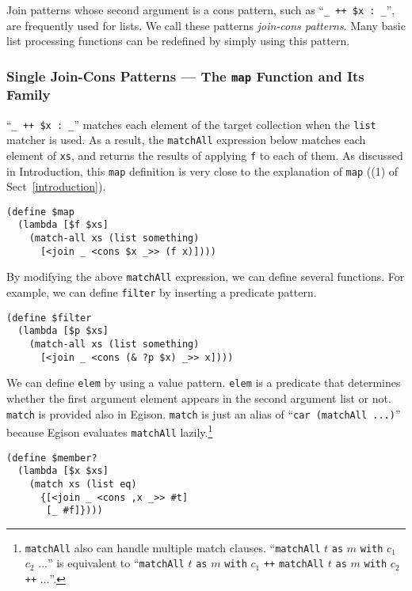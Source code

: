 \documentclass{article}
\begin{document}
Join patterns whose second argument is a cons pattern, such as ``\verb|_ ++ $x : _|'', are frequently used for lists.
We call these patterns \emph{join-cons patterns}.
Many basic list processing functions can be redefined by simply using this pattern.

\subsubsection{Single Join-Cons Patterns --- The \texttt{map} Function and Its Family}

``\verb|_ ++ $x : _|'' matches each element of the target collection when the \texttt{list} matcher is used.
As a result, the \texttt{matchAll} expression below matches each element of \texttt{xs}, and returns the results of applying \texttt{f} to each of them.
As discussed in Introduction, this \texttt{map} definition is very close to the explanation of \texttt{map} ((1) of Sect~\ref{introduction}).

\begin{lstlisting}[language=egison]
(define $map
  (lambda [$f $xs]
    (match-all xs (list something)
      [<join _ <cons $x _>> (f x)])))
\end{lstlisting}

By modifying the above \texttt{matchAll} expression, we can define several functions.
For example, we can define \texttt{filter} by inserting a predicate pattern.

\begin{lstlisting}[language=egison]
(define $filter
  (lambda [$p $xs]
    (match-all xs (list something)
      [<join _ <cons (& ?p $x) _>> x])))
\end{lstlisting}

\noindent We can define \texttt{elem} by using a value pattern.
\texttt{elem} is a predicate that determines whether the first argument element appears in the second argument list or not.
\texttt{match} is provided also in Egison.
\texttt{match} is just an alias of ``\texttt{car (matchAll ...)}'' because Egison evaluates \texttt{matchAll} lazily.\footnote{\texttt{matchAll} also can handle multiple match clauses. ``\texttt{matchAll} $t$ \texttt{as} $m$ \texttt{with} $c_1$ $c_2$ $...$'' is equivalent to ``\texttt{matchAll} $t$ \texttt{as} $m$ \texttt{with} $c_1$ \texttt{++} \texttt{matchAll} $t$ \texttt{as} $m$ \texttt{with} $c_2$ \texttt{++} $...$''.}

{\footnotesize
\begin{lstlisting}[language=egison]
(define $member?
  (lambda [$x $xs]
    (match xs (list eq)
      {[<join _ <cons ,x _>> #t]
       [_ #f]})))
\end{lstlisting}
}
\end{document}
